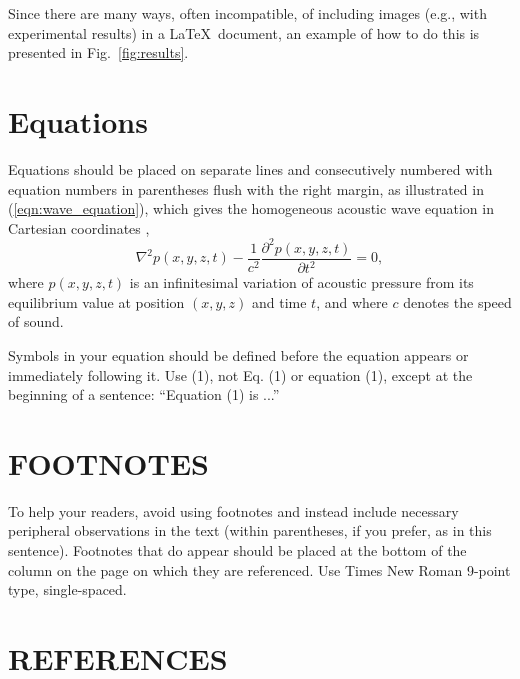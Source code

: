 \documentclass[a4paper,10pt,oneside]{article}
\begin{document}
\begin{sloppy}
Since there are many ways, often incompatible, of including images (e.g., with experimental results) in a \LaTeX ~document, an example of how to do this is presented in Fig.~\ref{fig:results}.



\section{Equations}
\label{sec:equations}

Equations should be placed on separate lines and consecutively numbered with equation numbers in parentheses flush with the right margin, as illustrated in (\ref{eqn:wave_equation}), which gives the homogeneous acoustic wave equation in Cartesian coordinates \cite{eWilliams1999},
\begin{equation}
  \label{eqn:wave_equation}
    \nabla^2p(x,y,z,t)-
    \displaystyle\frac{1}{c^2}\frac{\partial^2p(x,y,z,t)}{\partial t^2}=0,
\end{equation}
where $p(x,y,z,t)$ is an infinitesimal variation of acoustic pressure from its equilibrium value at position $(x,y,z)$ and time $t$, and where $c$ denotes the speed of sound.

Symbols in your equation should be defined before the equation appears or immediately following it. Use (1), not Eq. (1) or equation (1), except at the beginning of a sentence: ``Equation (1) is ...''

\section{FOOTNOTES}
\label{sec:foot}

To help your readers, avoid using footnotes and instead include necessary peripheral observations in the text (within parentheses, if you prefer, as in this sentence). Footnotes that do appear should be placed at the bottom of the column on the page on which they are referenced. Use Times New Roman 9-point type, single-spaced. 

\section{REFERENCES}
\label{sec:ref}


\end{sloppy}
\end{document}
